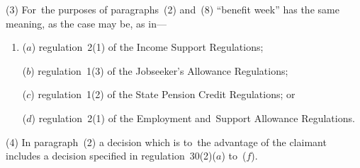 \documentclass[12pt,a4paper]{article}
\begin{document}

(3) For~the purposes of paragraphs~(2) and~(8) “benefit week” has the same meaning, as the case may be, as in—
\begin{enumerate}\item[]
($a$) regulation~2(1) of the Income Support Regulations;

($b$) regulation~1(3) of the Jobseeker’s Allowance Regulations;

($c$) regulation~1(2) of the State Pension Credit Regulations; or

($d$) regulation~2(1) of the Employment and~Support Allowance Regulations.
\end{enumerate}

(4) In paragraph~(2) a decision which is to~the advantage of the claimant includes a decision specified in regulation~30(2)($a$) to~($f$).

%
\end{document}
